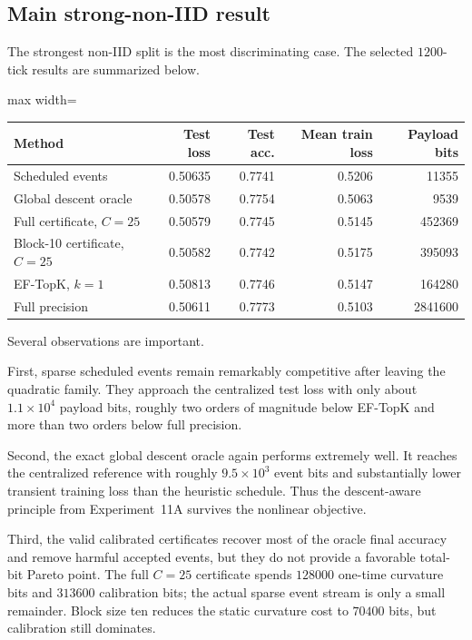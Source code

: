 \subsection{Main strong-non-IID result}

The strongest non-IID split is the most discriminating case. The selected $1200$-tick results are summarized below.

\begin{center}
\begin{adjustbox}{max width=\textwidth}
\begin{tabular}{lrrrr}
\toprule
Method & Test loss & Test acc. & Mean train loss & Payload bits\\
\midrule
Scheduled events & 0.50635 & 0.7741 & 0.5206 & 11355\\
Global descent oracle & 0.50578 & 0.7754 & 0.5063 & 9539\\
Full certificate, $C=25$ & 0.50579 & 0.7745 & 0.5145 & 452369\\
Block-10 certificate, $C=25$ & 0.50582 & 0.7742 & 0.5175 & 395093\\
EF-TopK, $k=1$ & 0.50813 & 0.7746 & 0.5147 & 164280\\
Full precision & 0.50611 & 0.7773 & 0.5103 & 2841600\\
\bottomrule
\end{tabular}
\end{adjustbox}
\end{center}

Several observations are important.

First, sparse scheduled events remain remarkably competitive after leaving the quadratic family. They approach the centralized test loss with only about $1.1\times10^4$ payload bits, roughly two orders of magnitude below EF-TopK and more than two orders below full precision.

Second, the exact global descent oracle again performs extremely well. It reaches the centralized reference with roughly $9.5\times10^3$ event bits and substantially lower transient training loss than the heuristic schedule. Thus the descent-aware principle from Experiment~11A survives the nonlinear objective.

Third, the valid calibrated certificates recover most of the oracle final accuracy and remove harmful accepted events, but they do not provide a favorable total-bit Pareto point. The full $C=25$ certificate spends $128000$ one-time curvature bits and $313600$ calibration bits; the actual sparse event stream is only a small remainder. Block size ten reduces the static curvature cost to $70400$ bits, but calibration still dominates.

